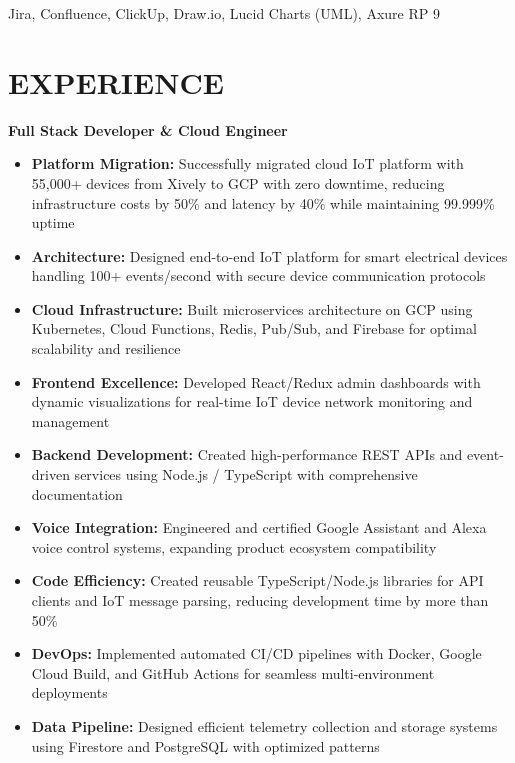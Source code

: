 \documentclass{fullstackdeveloper-ats}
\begin{document}
\vspace{0.2cm}
\noindent{} Jira, Confluence, ClickUp, Draw.io, Lucid Charts (UML), Axure RP 9

\section{EXPERIENCE}

\noindent\textbf{Full Stack Developer \& Cloud Engineer} \hfill {}\\

\begin{itemize}
    \item \textbf{Platform Migration:} Successfully migrated cloud IoT platform with 55,000+ devices from Xively to GCP with zero downtime, reducing infrastructure costs by 50\% and latency by 40\% while maintaining 99.999\% uptime
    \item \textbf{Architecture:} Designed end-to-end IoT platform for smart electrical devices handling 100+ events/second with secure device communication protocols
    \item \textbf{Cloud Infrastructure:} Built microservices architecture on GCP using Kubernetes, Cloud Functions, Redis, Pub/Sub, and Firebase for optimal scalability and resilience
    \item \textbf{Frontend Excellence:} Developed React/Redux admin dashboards with dynamic visualizations for real-time IoT device network monitoring and management
    \item \textbf{Backend Development:} Created high-performance REST APIs and event-driven services using Node.js /  TypeScript with comprehensive documentation
    \item \textbf{Voice Integration:} Engineered and certified Google Assistant and Alexa voice control systems, expanding product ecosystem compatibility
    \item \textbf{Code Efficiency:} Created reusable TypeScript/Node.js libraries for API clients and IoT message parsing, reducing development time by more than 50\%
    \item \textbf{DevOps:} Implemented automated CI/CD pipelines with Docker, Google Cloud Build, and GitHub Actions for seamless multi-environment deployments
    \item \textbf{Data Pipeline:} Designed efficient telemetry collection and storage systems using Firestore and PostgreSQL with optimized patterns
\end{itemize}
\end{document}
